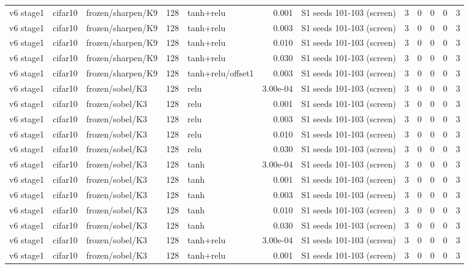 \begin{table}[htbp]
{\begin{tabular}{@{}lllrlrlrrrrr@{}}
v6 stage1 & cifar10 & frozen/sharpen/K9 & 128 & tanh+relu & 0.001 & S1 seeds 101-103 (screen) & 3 & 0 & 0 & 0 & 3 \\
v6 stage1 & cifar10 & frozen/sharpen/K9 & 128 & tanh+relu & 0.003 & S1 seeds 101-103 (screen) & 3 & 0 & 0 & 0 & 3 \\
v6 stage1 & cifar10 & frozen/sharpen/K9 & 128 & tanh+relu & 0.010 & S1 seeds 101-103 (screen) & 3 & 0 & 0 & 0 & 3 \\
v6 stage1 & cifar10 & frozen/sharpen/K9 & 128 & tanh+relu & 0.030 & S1 seeds 101-103 (screen) & 3 & 0 & 0 & 0 & 3 \\
v6 stage1 & cifar10 & frozen/sharpen/K9 & 128 & tanh+relu/offset1 & 0.003 & S1 seeds 101-103 (screen) & 3 & 0 & 0 & 0 & 3 \\
v6 stage1 & cifar10 & frozen/sobel/K3 & 128 & relu & 3.00e-04 & S1 seeds 101-103 (screen) & 3 & 0 & 0 & 0 & 3 \\
v6 stage1 & cifar10 & frozen/sobel/K3 & 128 & relu & 0.001 & S1 seeds 101-103 (screen) & 3 & 0 & 0 & 0 & 3 \\
v6 stage1 & cifar10 & frozen/sobel/K3 & 128 & relu & 0.003 & S1 seeds 101-103 (screen) & 3 & 0 & 0 & 0 & 3 \\
v6 stage1 & cifar10 & frozen/sobel/K3 & 128 & relu & 0.010 & S1 seeds 101-103 (screen) & 3 & 0 & 0 & 0 & 3 \\
v6 stage1 & cifar10 & frozen/sobel/K3 & 128 & relu & 0.030 & S1 seeds 101-103 (screen) & 3 & 0 & 0 & 0 & 3 \\
v6 stage1 & cifar10 & frozen/sobel/K3 & 128 & tanh & 3.00e-04 & S1 seeds 101-103 (screen) & 3 & 0 & 0 & 0 & 3 \\
v6 stage1 & cifar10 & frozen/sobel/K3 & 128 & tanh & 0.001 & S1 seeds 101-103 (screen) & 3 & 0 & 0 & 0 & 3 \\
v6 stage1 & cifar10 & frozen/sobel/K3 & 128 & tanh & 0.003 & S1 seeds 101-103 (screen) & 3 & 0 & 0 & 0 & 3 \\
v6 stage1 & cifar10 & frozen/sobel/K3 & 128 & tanh & 0.010 & S1 seeds 101-103 (screen) & 3 & 0 & 0 & 0 & 3 \\
v6 stage1 & cifar10 & frozen/sobel/K3 & 128 & tanh & 0.030 & S1 seeds 101-103 (screen) & 3 & 0 & 0 & 0 & 3 \\
v6 stage1 & cifar10 & frozen/sobel/K3 & 128 & tanh+relu & 3.00e-04 & S1 seeds 101-103 (screen) & 3 & 0 & 0 & 0 & 3 \\
v6 stage1 & cifar10 & frozen/sobel/K3 & 128 & tanh+relu & 0.001 & S1 seeds 101-103 (screen) & 3 & 0 & 0 & 0 & 3 \\

\end{tabular}}
\end{table}
